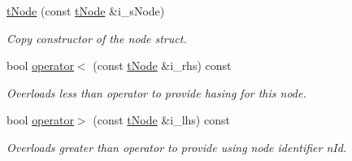 \begin{DoxyCompactItemize}
\mbox{\hyperlink{structplanner_1_1t_node_a18891f54e73f974f1142fba95887de98}{t\+Node}} (const \mbox{\hyperlink{structplanner_1_1t_node}{t\+Node}} \&i\+\_\+s\+Node)
\begin{DoxyCompactList}\small\item\em Copy constructor of the node struct. \end{DoxyCompactList}\item 
bool \mbox{\hyperlink{structplanner_1_1t_node_a5085f3fcf4a960ed9fe14068f1b5e950}{operator$<$}} (const \mbox{\hyperlink{structplanner_1_1t_node}{t\+Node}} \&i\+\_\+rhs) const
\begin{DoxyCompactList}\small\item\em Overloads less than operator to provide hasing for this node. \end{DoxyCompactList}\item 
\mbox{\label{structplanner_1_1t_node_ad0d6e37475fe4a78abb8f271220c999e}} 
bool \mbox{\hyperlink{structplanner_1_1t_node_ad0d6e37475fe4a78abb8f271220c999e}{operator$>$}} (const \mbox{\hyperlink{structplanner_1_1t_node}{t\+Node}} \&i\+\_\+lhs) const
\begin{DoxyCompactList}\small\item\em Overloads greater than operator to provide using node identifier n\+Id. \end{DoxyCompactList}\end{DoxyCompactItemize}
